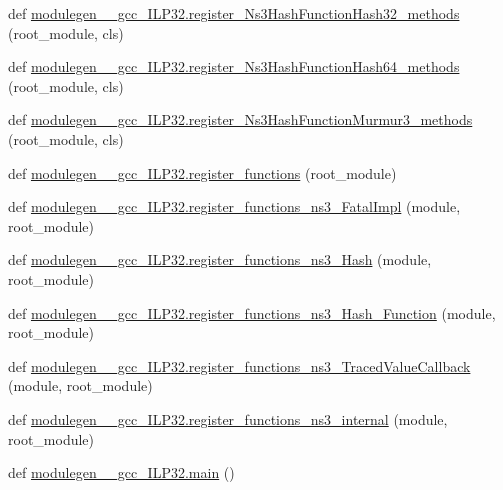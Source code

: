 \begin{DoxyCompactItemize}
\item 
def \hyperlink{namespacemodulegen____gcc__ILP32_afac315fff05eebcf56ca0655484fb790}{modulegen\+\_\+\+\_\+gcc\+\_\+\+I\+L\+P32.\+register\+\_\+\+Ns3\+Hash\+Function\+Hash32\+\_\+methods} (root\+\_\+module, cls)
\item 
def \hyperlink{namespacemodulegen____gcc__ILP32_a5bb0479ce8e16c48c18c0b8db959d57b}{modulegen\+\_\+\+\_\+gcc\+\_\+\+I\+L\+P32.\+register\+\_\+\+Ns3\+Hash\+Function\+Hash64\+\_\+methods} (root\+\_\+module, cls)
\item 
def \hyperlink{namespacemodulegen____gcc__ILP32_aac40fb7a316e95e431da9cf4c6a3e3a0}{modulegen\+\_\+\+\_\+gcc\+\_\+\+I\+L\+P32.\+register\+\_\+\+Ns3\+Hash\+Function\+Murmur3\+\_\+methods} (root\+\_\+module, cls)
\item 
def \hyperlink{namespacemodulegen____gcc__ILP32_a78223e19764a9a9c4a101c5cff0fe501}{modulegen\+\_\+\+\_\+gcc\+\_\+\+I\+L\+P32.\+register\+\_\+functions} (root\+\_\+module)
\item 
def \hyperlink{namespacemodulegen____gcc__ILP32_afe103c28425c708bef38a8cb16badb60}{modulegen\+\_\+\+\_\+gcc\+\_\+\+I\+L\+P32.\+register\+\_\+functions\+\_\+ns3\+\_\+\+Fatal\+Impl} (module, root\+\_\+module)
\item 
def \hyperlink{namespacemodulegen____gcc__ILP32_a15bbba0d88ee02afb1f5d32d8a94ea14}{modulegen\+\_\+\+\_\+gcc\+\_\+\+I\+L\+P32.\+register\+\_\+functions\+\_\+ns3\+\_\+\+Hash} (module, root\+\_\+module)
\item 
def \hyperlink{namespacemodulegen____gcc__ILP32_a0f9329a49ae57d68c45aee88be7a193f}{modulegen\+\_\+\+\_\+gcc\+\_\+\+I\+L\+P32.\+register\+\_\+functions\+\_\+ns3\+\_\+\+Hash\+\_\+\+Function} (module, root\+\_\+module)
\item 
def \hyperlink{namespacemodulegen____gcc__ILP32_af7ef11aed69cbf420d75dc2f54dcef3d}{modulegen\+\_\+\+\_\+gcc\+\_\+\+I\+L\+P32.\+register\+\_\+functions\+\_\+ns3\+\_\+\+Traced\+Value\+Callback} (module, root\+\_\+module)
\item 
def \hyperlink{namespacemodulegen____gcc__ILP32_a38f99ffef038c5418d70aef09b99e58d}{modulegen\+\_\+\+\_\+gcc\+\_\+\+I\+L\+P32.\+register\+\_\+functions\+\_\+ns3\+\_\+internal} (module, root\+\_\+module)
\item 
def \hyperlink{namespacemodulegen____gcc__ILP32_aadf64690f6ba129a8d42469ea6da5a2d}{modulegen\+\_\+\+\_\+gcc\+\_\+\+I\+L\+P32.\+main} ()
\end{DoxyCompactItemize}

